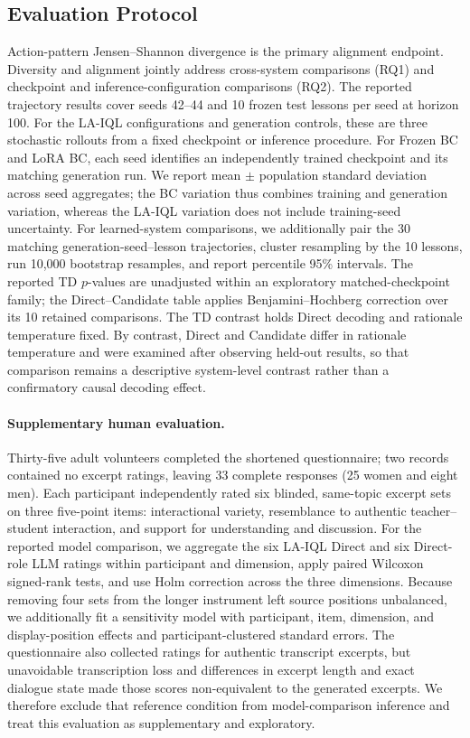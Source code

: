 \documentclass[manuscript,review,anonymous]{acmart}
\begin{document}
\subsection{Evaluation Protocol}

Action-pattern Jensen--Shannon divergence is the primary alignment endpoint.
Diversity and alignment jointly address cross-system comparisons (RQ1) and
checkpoint and inference-configuration comparisons (RQ2).
The reported trajectory results cover seeds 42--44 and 10 frozen test lessons
per seed at horizon 100. For the LA-IQL configurations and generation controls,
these are three stochastic rollouts from a fixed checkpoint or inference
procedure. For Frozen BC and LoRA BC, each seed identifies an independently
trained checkpoint and its matching generation run. We report mean $\pm$
population standard deviation across seed aggregates; the BC variation thus
combines training and generation variation, whereas the LA-IQL variation does
not include training-seed uncertainty. For
learned-system comparisons, we additionally pair the 30 matching
generation-seed--lesson trajectories, cluster resampling by the 10 lessons, run
10,000 bootstrap resamples, and report percentile 95\% intervals. The reported
TD $p$-values are unadjusted within an exploratory matched-checkpoint family;
the Direct--Candidate table applies Benjamini--Hochberg correction over its 10
retained comparisons. The TD contrast holds Direct decoding and rationale
temperature fixed. By contrast, Direct and Candidate differ in rationale
temperature and were examined after observing held-out results, so that
comparison remains a descriptive system-level contrast rather than a
confirmatory causal decoding effect.

\paragraph{Supplementary human evaluation.}
Thirty-five adult volunteers completed the shortened questionnaire; two records
contained no excerpt ratings, leaving 33 complete responses (25 women and eight
men). Each participant independently rated six blinded, same-topic excerpt sets
on three five-point items: interactional variety, resemblance to authentic
teacher--student interaction, and support for understanding and discussion.
For the reported model comparison, we aggregate the six LA-IQL Direct and six
Direct-role LLM ratings within participant and dimension, apply paired Wilcoxon
signed-rank tests, and use Holm correction across the three dimensions. Because
removing four sets from the longer instrument left source positions unbalanced,
we additionally fit a sensitivity model with participant, item, dimension, and
display-position effects and participant-clustered standard errors. The
questionnaire also collected ratings for authentic transcript excerpts, but
unavoidable transcription loss and differences in excerpt length and exact
dialogue state made those scores non-equivalent to the generated excerpts. We
therefore exclude that reference condition from model-comparison inference and
treat this evaluation as supplementary and exploratory.
\end{document}

